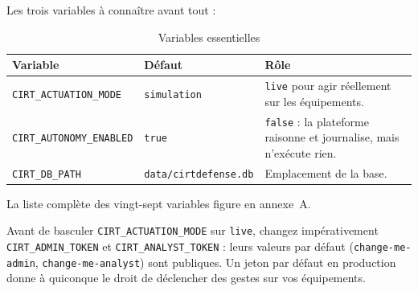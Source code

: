 Les trois variables à connaître avant tout :

\begin{table}[h]
\centering
\begin{tabular}{@{}p{5.4cm}p{2.4cm}p{5.6cm}@{}}
\toprule
\textbf{Variable} & \textbf{Défaut} & \textbf{Rôle} \\
\midrule
\texttt{CIRT\_ACTUATION\_MODE} & \texttt{simulation} &
\texttt{live} pour agir réellement sur les équipements. \\[6pt]
\texttt{CIRT\_AUTONOMY\_ENABLED} & \texttt{true} &
\texttt{false} : la plateforme raisonne et journalise, mais n'exécute rien. \\[6pt]
\texttt{CIRT\_DB\_PATH} & \texttt{data/cirtdefense.db} &
Emplacement de la base. \\
\bottomrule
\end{tabular}
\caption{Variables essentielles}
\end{table}

La liste complète des vingt-sept variables figure en annexe~A.

\begin{tcolorbox}[colback=orange!5!white, colframe=orange!70!black,
  title=\textbf{Attention --- passage en production}, fonttitle=\bfseries,
  boxrule=0.6pt]
Avant de basculer \texttt{CIRT\_ACTUATION\_MODE} sur \texttt{live}, changez
impérativement \texttt{CIRT\_ADMIN\_TOKEN} et \texttt{CIRT\_ANALYST\_TOKEN} :
leurs valeurs par défaut (\texttt{change-me-admin},
\texttt{change-me-analyst}) sont publiques. Un jeton par défaut en production
donne à quiconque le droit de déclencher des gestes sur vos équipements.
\end{tcolorbox}
